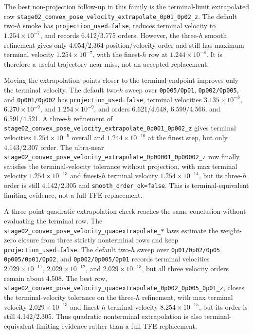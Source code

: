 \documentclass[11pt]{article}
\newcommand{\tfe}{TFE}
\begin{document}
The best non-projection follow-up in this family is the terminal-limit
extrapolated row
\nolinkurl{stage02_convex_pose_velocity_extrapolate_0p01_0p02_z}.  The default
two-$h$ smoke has \nolinkurl{projection_used=false}, reduces terminal velocity
to $1.254\times10^{-7}$, and records 6.412/3.775 orders.  However, the
three-$h$ smooth refinement gives only 4.054/2.364 position/velocity order and
still has maximum terminal velocity $1.254\times10^{-7}$, with the finest-$h$
row at $1.244\times10^{-8}$.  It is therefore a useful trajectory near-miss,
not an accepted replacement.

Moving the extrapolation points closer to the terminal endpoint improves only
the terminal velocity.  The default two-$h$ sweep over
\nolinkurl{0p005/0p01}, \nolinkurl{0p002/0p005}, and \nolinkurl{0p001/0p002}
has \nolinkurl{projection_used=false}, terminal velocities
$3.135\times10^{-8}$, $6.270\times10^{-9}$, and $1.254\times10^{-9}$, and
orders 6.621/4.648, 6.599/4.566, and 6.591/4.521.  A three-$h$ refinement of
\nolinkurl{stage02_convex_pose_velocity_extrapolate_0p001_0p002_z} gives
terminal velocities $1.254\times10^{-9}$ overall and $1.244\times10^{-10}$ at
the finest step, but only 4.143/2.307 order.  The ultra-near
\nolinkurl{stage02_convex_pose_velocity_extrapolate_0p00001_0p00002_z} row
finally satisfies the terminal-velocity tolerance without projection, with max
terminal velocity $1.254\times10^{-13}$ and finest-$h$ terminal velocity
$1.254\times10^{-14}$, but its three-$h$ order is still 4.142/2.305 and
\nolinkurl{smooth_order_ok=false}.  This is terminal-equivalent limiting
evidence, not a full-\tfe{} replacement.

A three-point quadratic extrapolation check reaches the same conclusion without
evaluating the terminal row.  The
\nolinkurl{stage02_convex_pose_velocity_quadextrapolate_*} laws estimate the
weight-zero closure from three strictly nonterminal rows and keep
\nolinkurl{projection_used=false}.  The default two-$h$ sweep over
\nolinkurl{0p01/0p02/0p05}, \nolinkurl{0p005/0p01/0p02}, and
\nolinkurl{0p002/0p005/0p01} records terminal velocities
$2.029\times10^{-11}$, $2.029\times10^{-12}$, and $2.029\times10^{-13}$, but
all three velocity orders remain about 4.508.  The best row,
\nolinkurl{stage02_convex_pose_velocity_quadextrapolate_0p002_0p005_0p01_z},
closes the terminal-velocity tolerance on the three-$h$ refinement, with max
terminal velocity $2.029\times10^{-13}$ and finest-$h$ terminal velocity
$8.254\times10^{-15}$, but its order is still 4.142/2.305.  Thus quadratic
nonterminal extrapolation is also terminal-equivalent limiting evidence rather
than a full-\tfe{} replacement.
\end{document}
